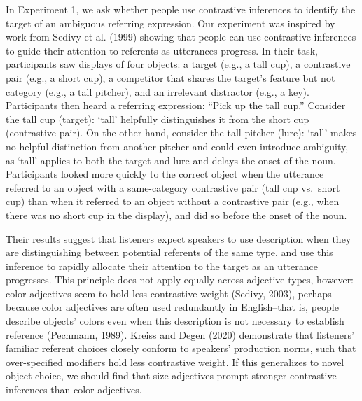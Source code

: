\documentclass[
  english,
  man,floatsintext]{apa6}
\begin{document}
In Experiment 1, we ask whether people use contrastive inferences to identify the target of an ambiguous referring expression. Our experiment was inspired by work from Sedivy et al. (1999) showing that people can use contrastive inferences to guide their attention to referents as utterances progress. In their task, participants saw displays of four objects: a target (e.g., a tall cup), a contrastive pair (e.g., a short cup), a competitor that shares the target's feature but not category (e.g., a tall pitcher), and an irrelevant distractor (e.g., a key). Participants then heard a referring expression: ``Pick up the tall cup.'' Consider the tall cup (target): `tall' helpfully distinguishes it from the short cup (contrastive pair). On the other hand, consider the tall pitcher (lure): `tall' makes no helpful distinction from another pitcher and could even introduce ambiguity, as `tall' applies to both the target and lure and delays the onset of the noun. Participants looked more quickly to the correct object when the utterance referred to an object with a same-category contrastive pair (tall cup vs.~short cup) than when it referred to an object without a contrastive pair (e.g., when there was no short cup in the display), and did so before the onset of the noun.

Their results suggest that listeners expect speakers to use description when they are distinguishing between potential referents of the same type, and use this inference to rapidly allocate their attention to the target as an utterance progresses. This principle does not apply equally across adjective types, however: color adjectives seem to hold less contrastive weight (Sedivy, 2003), perhaps because color adjectives are often used redundantly in English--that is, people describe objects' colors even when this description is not necessary to establish reference (Pechmann, 1989). Kreiss and Degen (2020) demonstrate that listeners' familiar referent choices closely conform to speakers' production norms, such that over-specified modifiers hold less contrastive weight. If this generalizes to novel object choice, we should find that size adjectives prompt stronger contrastive inferences than color adjectives.
\end{document}
